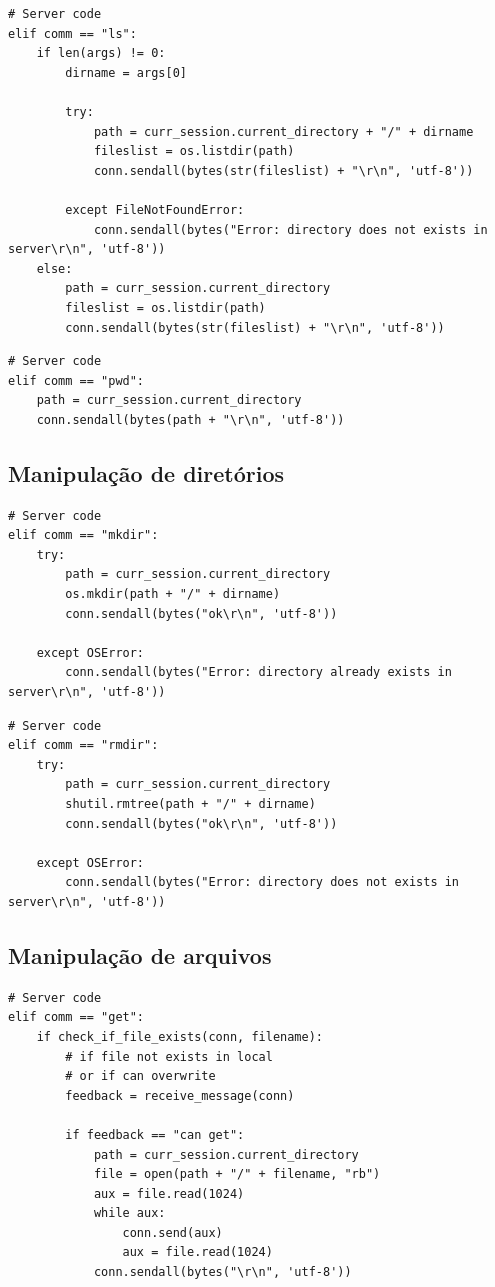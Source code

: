 \documentclass[conference]{IEEEtran}
\begin{document}
\begin{lstlisting}
# Server code
elif comm == "ls":
	if len(args) != 0:
	    dirname = args[0]
	    
	    try:
	    	path = curr_session.current_directory + "/" + dirname
	    	fileslist = os.listdir(path)
			conn.sendall(bytes(str(fileslist) + "\r\n", 'utf-8'))

	    except FileNotFoundError:
			conn.sendall(bytes("Error: directory does not exists in server\r\n", 'utf-8'))
	else:
		path = curr_session.current_directory
		fileslist = os.listdir(path)
	    conn.sendall(bytes(str(fileslist) + "\r\n", 'utf-8'))
\end{lstlisting}

\begin{lstlisting}
# Server code
elif comm == "pwd":
	path = curr_session.current_directory
	conn.sendall(bytes(path + "\r\n", 'utf-8'))
\end{lstlisting}

\subsection{Manipulação de diretórios}

\begin{lstlisting}
# Server code
elif comm == "mkdir":
	try:
		path = curr_session.current_directory
	    os.mkdir(path + "/" + dirname)
	    conn.sendall(bytes("ok\r\n", 'utf-8'))

	except OSError:
	    conn.sendall(bytes("Error: directory already exists in server\r\n", 'utf-8'))
\end{lstlisting}

\begin{lstlisting}
# Server code
elif comm == "rmdir":
	try:
		path = curr_session.current_directory
	    shutil.rmtree(path + "/" + dirname)
	    conn.sendall(bytes("ok\r\n", 'utf-8'))
	
	except OSError:
	    conn.sendall(bytes("Error: directory does not exists in server\r\n", 'utf-8'))
\end{lstlisting}

\subsection{Manipulação de arquivos}

\begin{lstlisting}
# Server code
elif comm == "get":
	if check_if_file_exists(conn, filename):
		# if file not exists in local
		# or if can overwrite
	    feedback = receive_message(conn)

	    if feedback == "can get":
			path = curr_session.current_directory
			file = open(path + "/" + filename, "rb")
			aux = file.read(1024)
			while aux:
		    	conn.send(aux)
		    	aux = file.read(1024)
			conn.sendall(bytes("\r\n", 'utf-8'))
\end{lstlisting}
\end{document}
